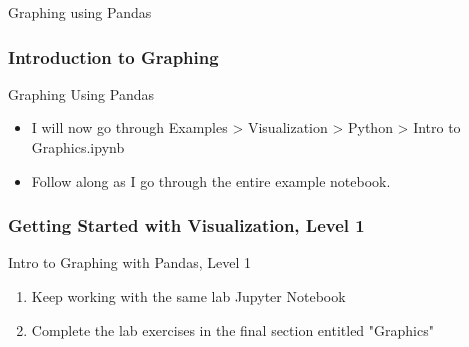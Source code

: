\documentclass[handout, 11pt]{beamer}
\begin{document}
\begin{section}[Graphs]{Graphing using Pandas}
\begin{frame}
\begin{adjustbox}{width=0.425\textwidth, height=0.8\textheight, keepaspectratio}
\end{adjustbox}
\end{frame}
\begin{frame}
\frametitle{Introduction to Graphing}
{
\begin{block}{Graphing Using Pandas}
\begin{itemize}
\item I will now go through Examples > Visualization > Python > Intro to Graphics.ipynb
\item Follow along as I go through the entire example notebook.
\end{itemize}
\end{block}
}
\end{frame}
\begin{frame}
\frametitle{Getting Started with Visualization, Level 1}
{
\begin{block}{Intro to Graphing with Pandas, Level 1}
\begin{enumerate}
\item Keep working with the same lab Jupyter Notebook
\item Complete the lab exercises in the final section entitled "Graphics"
\end{enumerate}
\vfill
\end{block}
}
\label{labs:intro-graphing-1}
\end{frame}
\end{section}
\end{document}
